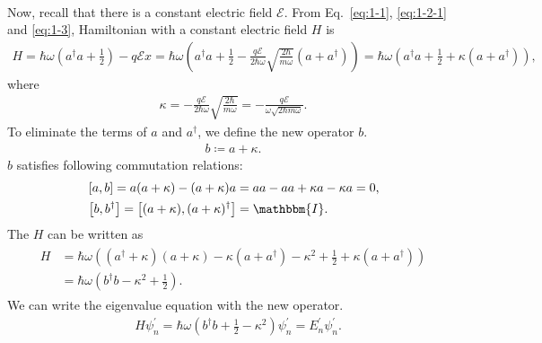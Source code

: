 \documentclass[floatfix,nofootinbib,superscriptaddress,fleqn]{revtex4-2}
\begin{document}
\begin{itemize}
\begin{align}
  \end{align}
  Now, recall that there is a constant 
  electric field $\mathcal{E}$. 
  From Eq.~\eqref{eq:1-1}, \eqref{eq:1-2-1} and \eqref{eq:1-3}, 
  Hamiltonian with a constant electric field $H$ is
   \begin{align}\label{eq:1-4}
    H = \hbar\omega\left(a^\dagger a 
    + \frac{1}{2}\right)-q\mathcal{E}x
    = \hbar\omega\left(a^\dagger a 
    + \frac{1}{2}-\frac{q\mathcal{E}}{2\hbar\omega}
    \sqrt{\frac{2\hbar}{m\omega}}
    \left(a+a^\dagger\right)\right)
    =\hbar\omega\left(a^\dagger a 
    + \frac{1}{2}+\kappa\left(a+a^\dagger\right)\right),
   \end{align}  
   where
  \begin{align}\label{eq:1-8}
   \kappa = -\frac{q\mathcal{E}}{2\hbar\omega}
   \sqrt{\frac{2\hbar}{m\omega}}
   =-\frac{q\mathcal{E}}{\omega\sqrt{2\hbar m\omega}}.
  \end{align}
   To eliminate the terms of $a$ and $a^\dagger$, we define the new operator $b$.
   \begin{align}\label{eq:1-5}
    b \coloneqq a + \kappa.
   \end{align}
   $b$ satisfies following commutation relations:
   \begin{align}\label{eq:1-6}
    \begin{split}
      &\left[a,b\right] = a(a+\kappa)-(a+\kappa)a 
      = aa-aa+\kappa a-\kappa a=0, \\
      &\left[b,b^\dagger\right] 
      = \left[(a+\kappa),(a+\kappa)^\dagger\right] 
      = \mathbbm{I}.
    \end{split}
   \end{align}
   The $H$ can be written as 
   \begin{align}\label{eq:1-7}
    \begin{split}
      H &= \hbar\omega\left((a^\dagger+\kappa)(a+\kappa)
      -\kappa(a+a^\dagger)-\kappa^2
      + \frac{1}{2}+\kappa\left(a+a^\dagger\right)\right)  \\
      &=\hbar\omega
      \left(
        b^\dagger b-\kappa^2
      + \frac{1}{2}
      \right).
    \end{split}
   \end{align}
    We can write the eigenvalue equation with the new operator.
    \begin{align}\label{eq:1-11}
      &H \psi^\prime_n = \hbar\omega\left(b^\dagger b
      + \frac{1}{2}-\kappa^2\right)\psi^\prime_n 
      = E^\prime_n \psi^\prime_n.
    \end{align}

\end{itemize}
\end{document}
